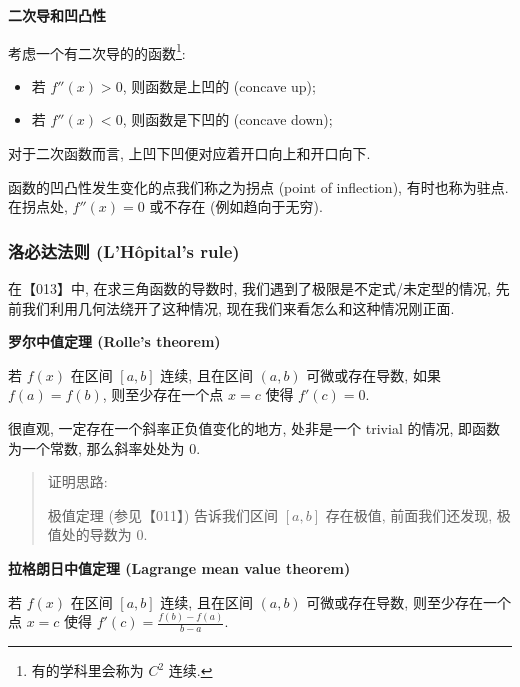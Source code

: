 \textbf{二次导和凹凸性}

考虑一个有二次导的的函数\footnote{有的学科里会称为 \(C^2\) 连续.}:

\begin{itemize}
\tightlist
\item
  若 \(f''(x)>0\), 则函数是上凹的 (concave up);
\item
  若 \(f''(x)<0\), 则函数是下凹的 (concave down);
\end{itemize}

对于二次函数而言, 上凹下凹便对应着开口向上和开口向下.

函数的凹凸性发生变化的点我们称之为拐点 (point of inflection),
有时也称为驻点. 在拐点处, \(f''(x)=0\) 或不存在 (例如趋向于无穷).

\hypertarget{ux6d1bux5fc5ux8fbeux6cd5ux5219-lhuxf4pitals-rule}{%
\subsubsection{洛必达法则 (L'Hôpital's
rule)}\label{ux6d1bux5fc5ux8fbeux6cd5ux5219-lhuxf4pitals-rule}}

在【013】中, 在求三角函数的导数时, 我们遇到了极限是不定式/未定型的情况,
先前我们利用几何法绕开了这种情况, 现在我们来看怎么和这种情况刚正面.

\textbf{罗尔中值定理 (Rolle's theorem)}

若 \(f(x)\) 在区间 \([a,b]\) 连续, 且在区间 \((a,b)\) 可微或存在导数,
如果 \(f(a)=f(b)\), 则至少存在一个点 \(x=c\) 使得 \(f'(c)=0\).

很直观, 一定存在一个斜率正负值变化的地方, 处非是一个 trivial 的情况,
即函数为一个常数, 那么斜率处处为 \(0\).

\begin{quote}
证明思路:

极值定理 (参见【011】) 告诉我们区间 \([a,b]\) 存在极值, 前面我们还发现,
极值处的导数为 \(0\).
\end{quote}

\textbf{拉格朗日中值定理 (Lagrange mean value theorem)}

若 \(f(x)\) 在区间 \([a,b]\) 连续, 且在区间 \((a,b)\) 可微或存在导数,
则至少存在一个点 \(x=c\) 使得 \(f'(c)=\frac{f(b)-f(a)}{b-a}\).

